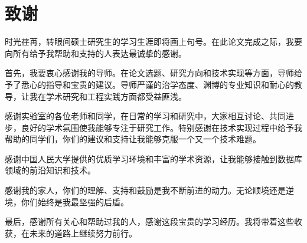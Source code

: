 \newpage
{}
\section*{致谢}

时光荏苒，转眼间硕士研究生的学习生涯即将画上句号。在此论文完成之际，我要向所有给予我帮助和支持的人表达最诚挚的感谢。

首先，我要衷心感谢我的导师。在论文选题、研究方向和技术实现等方面，导师给予了悉心的指导和宝贵的建议。导师严谨的治学态度、渊博的专业知识和耐心的教导，让我在学术研究和工程实践方面都受益匪浅。

感谢实验室的各位老师和同学，在日常的学习和研究中，大家相互讨论、共同进步，良好的学术氛围使我能够专注于研究工作。特别感谢在技术实现过程中给予我帮助的同学们，你们的建议和支持让我能够克服一个又一个技术难题。

感谢中国人民大学提供的优质学习环境和丰富的学术资源，让我能够接触到数据库领域的前沿知识和技术。

感谢我的家人，你们的理解、支持和鼓励是我不断前进的动力。无论顺境还是逆境，你们始终是我最坚强的后盾。

最后，感谢所有关心和帮助过我的人，感谢这段宝贵的学习经历。我将带着这些收获，在未来的道路上继续努力前行。




